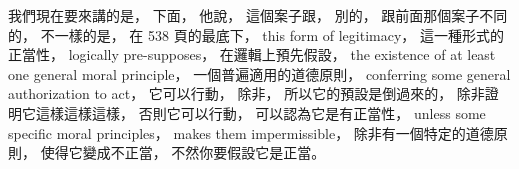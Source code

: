 \hypertarget{w02:cue:2443}{}我們現在要來講的是，
\hypertarget{w02:cue:2444}{}下面，
\hypertarget{w02:cue:2445}{}他說，
\hypertarget{w02:cue:2446}{}這個案子跟，
\hypertarget{w02:cue:2447}{}別的，
\hypertarget{w02:cue:2448}{}跟前面那個案子不同的，
\hypertarget{w02:cue:2449}{}不一樣的是，
\hypertarget{w02:cue:2450}{}在 538 頁的最底下，
\hypertarget{w02:cue:2451}{}this form of legitimacy，
\hypertarget{w02:cue:2452}{}這一種形式的正當性，
\hypertarget{w02:cue:2453}{}logically pre-supposes，
\hypertarget{w02:cue:2454}{}在邏輯上預先假設，
\hypertarget{w02:cue:2455}{}the existence of at least one general moral principle，
\hypertarget{w02:cue:2456}{}一個普遍適用的道德原則，
\hypertarget{w02:cue:2457}{}conferring some general authorization to act，
\hypertarget{w02:cue:2458}{}它可以行動，
\hypertarget{w02:cue:2459}{}除非，
\hypertarget{w02:cue:2460}{}所以它的預設是倒過來的，
\hypertarget{w02:cue:2461}{}除非證明它這樣這樣這樣，
\hypertarget{w02:cue:2462}{}否則它可以行動，
\hypertarget{w02:cue:2463}{}可以認為它是有正當性，
\hypertarget{w02:cue:2464}{}unless some specific moral principles，
\hypertarget{w02:cue:2465}{}makes them impermissible，
\hypertarget{w02:cue:2466}{}除非有一個特定的道德原則，
\hypertarget{w02:cue:2467}{}使得它變成不正當，
\hypertarget{w02:cue:2468}{}不然你要假設它是正當。

